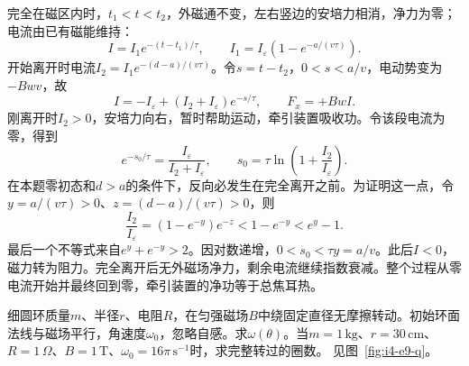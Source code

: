 \begin{solution}
完全在磁区内时，$t_1<t<t_2$，外磁通不变，左右竖边的安培力相消，净力为零；电流由已有磁能维持：
\[
I=I_1e^{-(t-t_1)/\tau},\qquad I_1=I_\varepsilon(1-e^{-a/(v\tau)}).
\]
开始离开时电流$I_2=I_1e^{-(d-a)/(v\tau)}$。令$s=t-t_2$，$0<s<a/v$，电动势变为$-Bwv$，故
\[
I=-I_\varepsilon+(I_2+I_\varepsilon)e^{-s/\tau},\qquad F_x=+BwI.
\]
刚离开时$I_2>0$，安培力向右，暂时帮助运动，牵引装置吸收功。令该段电流为零，得到
\[e^{-s_0/\tau}=\frac{I_\varepsilon}{I_2+I_\varepsilon},
\qquad s_0=\tau\ln\left(1+\frac{I_2}{I_\varepsilon}\right).\]
在本题零初态和$d>a$的条件下，反向必发生在完全离开之前。为证明这一点，令$y=a/(v\tau)>0$、$z=(d-a)/(v\tau)>0$，则
\[\frac{I_2}{I_\varepsilon}=(1-e^{-y})e^{-z}
<1-e^{-y}<e^y-1.\]
最后一个不等式来自$e^y+e^{-y}>2$。因对数递增，$0<s_0<\tau y=a/v$。此后$I<0$，磁力转为阻力。完全离开后无外磁场净力，剩余电流继续指数衰减。整个过程从零电流开始并最终回到零，牵引装置的净功等于总焦耳热。
\end{solution}

\begin{example}[电阻圆环绕直径转动]\label{ex:i4-e9}

细圆环质量$m$、半径$r$、电阻$R$，在匀强磁场$B$中绕固定直径无摩擦转动。初始环面法线与磁场平行，角速度$\omega_0$，忽略自感。求$\omega(\theta)$。当$m=1\,\mathrm{kg}$、$r=30\,\mathrm{cm}$、$R=1\,\Omega$、$B=1\,\mathrm T$、$\omega_0=16\pi\,\mathrm{s^{-1}}$时，求完整转过的圈数。
 见图~\ref{fig:i4-e9-q}。
\end{example}

